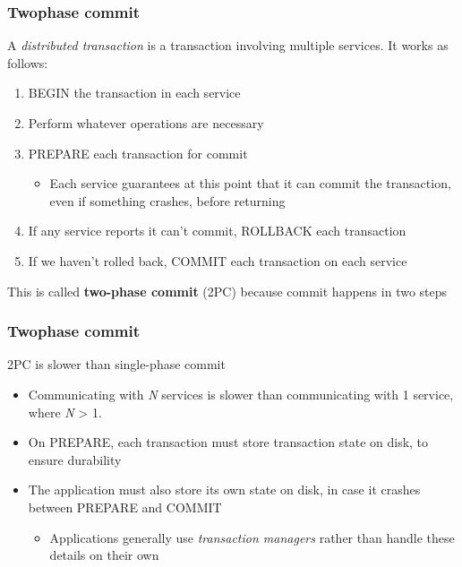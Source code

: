 \documentclass[svgnames]{beamer}
\begin{document}
\begin{frame}
    \frametitle{Two\textendash phase commit}
    A \textit{distributed transaction} is a transaction involving multiple services. It works as follows:
    \begin{enumerate}
        \item BEGIN the transaction in each service
        \item Perform whatever operations are necessary
        \item PREPARE each transaction for commit
        \begin{itemize}
            \item Each service guarantees at this point that it can commit the
            transaction, even if something crashes, before returning
        \end{itemize}
        \item If any service reports it can't commit, ROLLBACK each transaction
        \item If we haven't rolled back, COMMIT each transaction on each service
    \end{enumerate}
    This is called \textbf{two-phase commit} (2PC) because commit happens in two steps
\end{frame}

\begin{frame}
    \frametitle{Two\textendash phase commit}
    2PC is slower than single-phase commit
    \begin{itemize}
        \item Communicating with \textit{N} services is slower than
        communicating with 1 service, where \textit{N} > 1.
        \item On PREPARE, each transaction must store transaction state on disk, to ensure durability
        \item The application must also store its own state on disk, in case it crashes between PREPARE and COMMIT
        \begin{itemize}
            \item Applications generally use \textit{transaction managers} rather than handle these details on their own
        \end{itemize}
    \end{itemize}
\end{frame}
\end{document}
